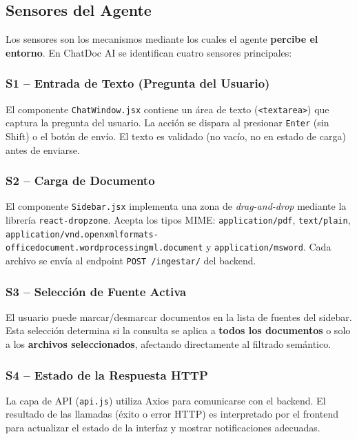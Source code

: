 \documentclass[12pt,a4paper]{article}
\begin{document}
\subsection{Sensores del Agente}

Los sensores son los mecanismos mediante los cuales el agente \textbf{percibe el entorno}. En ChatDoc AI se identifican cuatro sensores principales:

\subsubsection{S1 -- Entrada de Texto (Pregunta del Usuario)}

El componente \texttt{ChatWindow.jsx} contiene un área de texto (\texttt{<textarea>}) que captura la pregunta del usuario. La acción se dispara al presionar \texttt{Enter} (sin Shift) o el botón de envío. El texto es validado (no vacío, no en estado de carga) antes de enviarse.

\subsubsection{S2 -- Carga de Documento}

El componente \texttt{Sidebar.jsx} implementa una zona de \textit{drag-and-drop} mediante la librería \texttt{react-dropzone}. Acepta los tipos MIME: \texttt{application/pdf}, \texttt{text/plain}, \texttt{application/vnd.openxmlformats-officedocument.wordprocessingml.document} y \texttt{application/msword}. Cada archivo se envía al endpoint \texttt{POST /ingestar/} del backend.

\subsubsection{S3 -- Selección de Fuente Activa}

El usuario puede marcar/desmarcar documentos en la lista de fuentes del sidebar. Esta selección determina si la consulta se aplica a \textbf{todos los documentos} o solo a los \textbf{archivos seleccionados}, afectando directamente al filtrado semántico.

\subsubsection{S4 -- Estado de la Respuesta HTTP}

La capa de API (\texttt{api.js}) utiliza Axios para comunicarse con el backend. El resultado de las llamadas (éxito o error HTTP) es interpretado por el frontend para actualizar el estado de la interfaz y mostrar notificaciones adecuadas.
\end{document}
